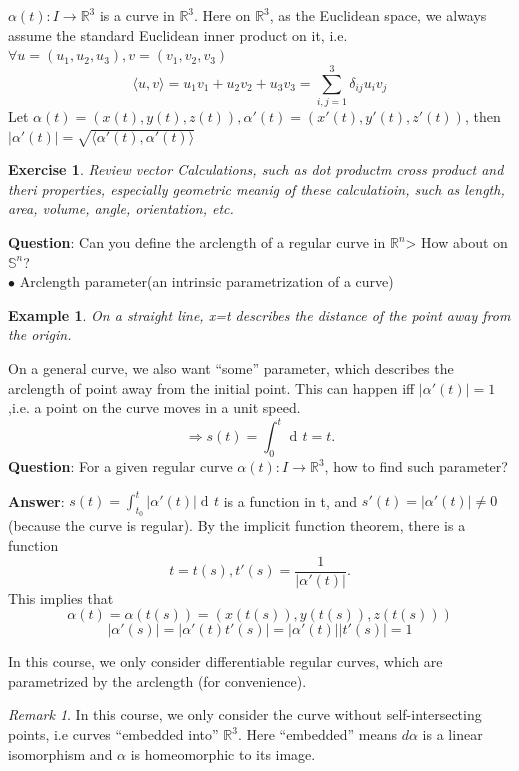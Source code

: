 \documentclass[UTF8,oneside,11pt]{book}
\DeclareMathOperator{\dd}{d\!}
\theoremstyle{plain}\newtheorem{thm}{Theorem}
\theoremstyle{definition}\newtheorem{defn}[thm]{Definition}
\theoremstyle{plain}\newtheorem{axiom}[thm]{Axiom}
\theoremstyle{plain}\newtheorem{coro}[thm]{Corollary}
\theoremstyle{plain}\newtheorem{lemma}[thm]{Lemma}
\theoremstyle{plain}\newtheorem{prop}[thm]{Proposition}
\theoremstyle{plain}\newtheorem{conj}[thm]{Conjecture}
\theoremstyle{plain}\newtheorem{ques}[thm]{Problem}
\theoremstyle{plain}\newtheorem{const}[thm]{Construction}
\theoremstyle{remark}\newtheorem{notation}[thm]{Notation}
\theoremstyle{plain}\newtheorem*{app}{Application}
\theoremstyle{plain}\newtheorem*{exam}{Example}
\theoremstyle{plain}\newtheorem*{exer}{Exercise}
\theoremstyle{remark}\newtheorem*{remark}{Remark}
\theoremstyle{remark}\newtheorem*{note}{\small{Note}}
\numberwithin{equation}{section}
\numberwithin{thm}{section}
\begin{document}
 
$\alpha(t)\colon I\to \mathbb{R}^3$ is a curve in $\mathbb{R}^3$. Here on $\mathbb{R}^3$, as the Euclidean space, we always assume the standard Euclidean inner product on it, i.e. $\forall u=(u_1,u_2,u_3),v=(v_1,v_2,v_3)$
\[\langle u,v\rangle=u_1 v_1+u_2 v_2+ u_3 v_3=\sum_{i,j=1}^3\delta_{ij}u_i v_j\]
Let $\alpha(t)=(x(t),y(t),z(t)),\alpha'(t)=(x'(t),y'(t),z'(t))$, then $\left|\alpha'(t)\right|=\sqrt{\langle\alpha'(t),\alpha'(t)\rangle}$
\begin{exer}
    Review vector Calculations, such as dot productm cross product and theri properties, especially geometric meanig of these calculatioin, such as length, area, volume, angle, orientation, etc.
\end{exer}
\noindent
\textbf{Question}: Can you define the arclength of a regular curve in $\mathbb{R}^n$> How about on $\mathbb{S}^n$? \\
$\bullet$ Arclength parameter(an intrinsic parametrization of a curve)
\begin{exam}
On a straight line, x=t describes the distance of the point away from the origin.
\begin{center}
\end{center}
\end{exam}
On a general curve, we also want ``some'' parameter, which describes the arclength of point away from the initial point. This can happen iff $|\alpha'(t)|=1$,i.e. a point on the curve moves in a unit speed.
\[\Rightarrow s(t)=\int_0^t \dd t=t.\]
\textbf{Question}: For a given regular curve $\alpha(t)\colon I\to \mathbb{R}^3$, how to find such parameter?

\noindent 
\textbf{Answer}: $s(t)=\int_{t_0}^t \left|\alpha'(t)\right|\dd t$ is a function in t, and $s'(t)=\left|\alpha'(t)\right|\neq 0$(because the curve is regular). By the implicit function theorem, there is a function 
\[
    t=t(s),t'(s)=\frac{1}{\left|\alpha'(t)\right|}.
\]
This implies that 
\[
    \alpha(t)=\alpha(t(s))=(x(t(s)),y(t(s)),z(t(s)))
\]
\[
    \left|\alpha'(s)\right|=\left|\alpha'(t)t'(s)\right|=\left|\alpha'(t)\right|\left|t'(s)\right|=1
\]

 In this course, we only consider differentiable regular curves, which are parametrized by the arclength (for convenience).
\begin{remark}
    In this course, we only consider the curve without self-intersecting points, i.e curves ``embedded into'' $\mathbb{R}^3$. Here ``embedded'' means $d\alpha$ is a linear isomorphism and $\alpha$ is homeomorphic to its image.
\end{remark}

\printbibliography{} %
\end{document}
